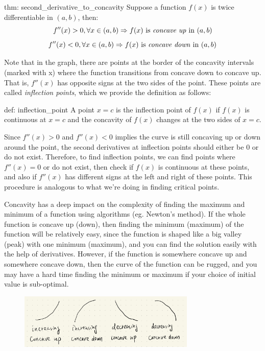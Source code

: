 \begin{theo}{thm: second_derivative_to_concavity}
    Suppose a function $f(x)$ is twice differentiable in $(a, b)$, then:
    \[f''(x) > 0, \forall x \in (a, b) \Rightarrow f(x) \text{ is \textit{concave up} in } (a,b)\]
    \[f''(x) < 0, \forall x \in (a, b) \Rightarrow f(x) \text{ is \textit{concave down} in } (a,b)\]
\end{theo}

Note that in the graph, there are points at the border of the concavity intervals (marked with x) where the function transitions from concave down to concave up.  That is, $f''(x)$ has opposite signs at the two sides of the point.  These points are called \textit{inflection points}, which we provide the definition as follows:  

\begin{defi}[]{def: inflection_point}
    A point $x=c$ is the inflection point of $f(x)$ if $f(x)$ is continuous at $x=c$ and the concavity of $f(x)$ changes at the two sides of $x=c$.
\end{defi}

Since $f''(x) > 0$ and $f''(x) < 0$ implies the curve is still concaving up or down around the point, the second derivatives at inflection points should either be $0$ or do not exist.  Therefore, to find inflection points, we can find points where $f''(x) = 0$ or do not exist, then check if $f(x)$ is continuous at these points, and also if $f''(x)$ has different signs at the left and right of these points.  This procedure is analogous to what we're doing in finding critical points.

\begin{remark}
    Concavity has a deep impact on the complexity of finding the maximum and minimum of a function using algorithms (eg. Newton's method).  If the whole function is concave up (down), then finding the minimum (maximum) of the function will be relatively easy, since the function is shaped like a big valley (peak) with one minimum (maximum), and you can find the solution easily with the help of derivatives.  However, if the function is somewhere concave up and somewhere concave down, then the curve of the function can be rugged, and you may have a hard time finding the minimum or maximum if your choice of initial value is sub-optimal.
\end{remark}

\begin{figure}[ht]
    \centering
    \includegraphics[width = 0.75\textwidth]{figures/chap 05/concavity_monotone.png}
    \label{fig: concavity_monotone}
\end{figure}

